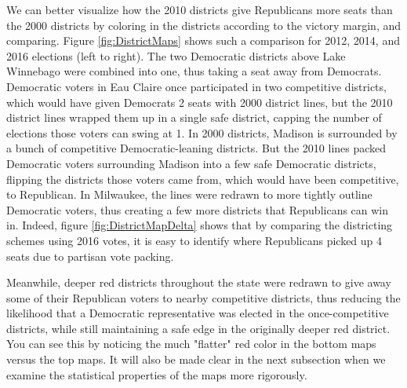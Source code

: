 \documentclass[preprint,12pt]{article}
\begin{document}
We can better visualize how the 2010 districts give Republicans more seats than the 2000 districts by coloring in the districts according to the victory margin, and comparing.
Figure \ref{fig:DistrictMaps} shows such a comparison for 2012, 2014, and 2016 elections (left to right).
The two Democratic districts above Lake Winnebago were combined into one, thus taking a seat away from Democrats.
Democratic voters in Eau Claire once participated in two competitive districts, which would have given Democrats 2 seats with 2000 district lines, but the 2010 district lines wrapped them up in a single safe district, capping the number of elections those voters can swing at 1.
In 2000 districts, Madison is surrounded by a bunch of competitive Democratic-leaning districts.
But the 2010 lines packed Democratic voters surrounding Madison into a few safe Democratic districts, flipping the districts those voters came from, which would have been competitive, to Republican.
In Milwaukee, the lines were redrawn to more tightly outline Democratic voters, thus creating a few more districts that Republicans can win in.
Indeed, figure \ref{fig:DistrictMapDelta} shows that by comparing the districting schemes using 2016 votes, it is easy to identify where Republicans picked up 4 seats due to partisan vote packing.

Meanwhile, deeper red districts throughout the state were redrawn to give away some of their Republican voters to nearby competitive districts,
thus reducing the likelihood that a Democratic representative was elected in the once-competitive districts,
while still maintaining a safe edge in the originally deeper red district.  
You can see this by noticing the much "flatter" red color in the bottom maps versus the top maps.
It will also be made clear in the next subsection when we examine the statistical properties of the maps more rigorously.
\end{document}
